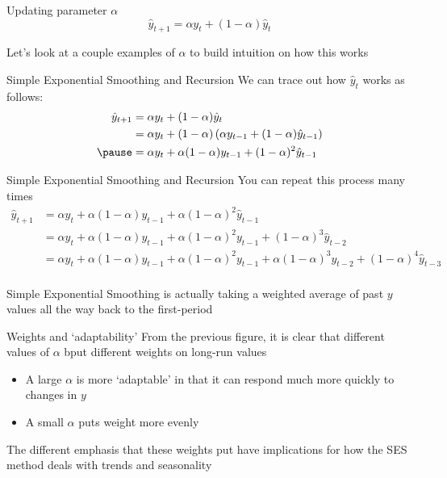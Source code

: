 \documentclass[aspectratio=169,t,11pt,table]{beamer}
\begin{document}
\begin{frame}{Updating parameter $\alpha$}
  \vspace*{-\bigskipamount}
  $$
    \hat{y}_{t+1} = \alpha y_t + (1 - \alpha) \hat{y}_{t}
  $$

  \bigskip
  Let's look at a couple examples of $\alpha$ to build intuition on how this works
\end{frame}


\begin{frame}{Simple Exponential Smoothing and Recursion}
  We can trace out how $\hat{y}_t$ works as follows:
  \begin{align*}
    \hat{y}_{t+1} 
    &= \alpha y_t + (1 - \alpha) \hat{y}_t \\
    &= \alpha y_t + (1 - \alpha) \left( \alpha y_{t-1} + (1 - \alpha) \hat{y}_{t-1} \right) \\
    \pause
    &= \alpha y_t + \alpha (1 - \alpha) y_{t-1} + (1 - \alpha)^2 \hat{y}_{t-1}  \\
  \end{align*}
\end{frame}

\begin{frame}{Simple Exponential Smoothing and Recursion}
  You can repeat this process many times
  \begin{align*}
    \hat{y}_{t+1} 
    &= \alpha y_t + \alpha (1 - \alpha) y_{t-1} + \alpha (1 - \alpha)^2 \hat{y}_{t-1}  \\
    &= \alpha y_t + \alpha (1 - \alpha) y_{t-1} + \alpha (1 - \alpha)^2  y_{t-1} + (1- \alpha)^3 \hat{y}_{t-2}  \\
    &= \alpha y_t + \alpha (1 - \alpha) y_{t-1} + \alpha (1 - \alpha)^2  y_{t-1} + \alpha (1- \alpha)^3 y_{t-2} + (1 - \alpha)^4 \hat{y}_{t-3}  \\
  \end{align*}

  \bigskip
  Simple Exponential Smoothing is actually taking a weighted average of past $y$ values all the way back to the first-period
\end{frame}


\begin{frame}{Weights and `adaptability'}
  From the previous figure, it is clear that different values of $\alpha$ bput different weights on long-run values
  \begin{itemize}
    \item A large $\alpha$ is more `adaptable' in that it can respond much more quickly to changes in $y$
    
    \item A small $\alpha$ puts weight more evenly
  \end{itemize}

  \bigskip
  The different emphasis that these weights put have implications for how the SES method deals with trends and seasonality
\end{frame}
\end{document}
